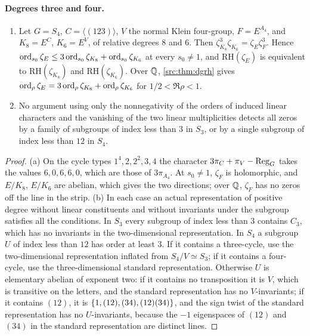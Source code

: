 \paragraph{Degrees three and four.}
\begin{proposition}\label{nab:prop:s4low}
\begin{enumerate}[label=\textup{(\alph*)}]
\item Let $G=S_4$, $C=\langle(123)\rangle$, $V$ the normal Klein four-group, $F=E^{A_4}$, and
$K_8=E^C$, $K_6=E^V$, of relative degrees $8$ and $6$. Then
$\zeta_{K_8}^3\zeta_{K_6}=\zeta_E\zeta_F^3$. Hence
$\operatorname{ord}_{s_0}\zeta_E\le3\operatorname{ord}_{s_0}\zeta_{K_8}+\operatorname{ord}_{s_0}\zeta_{K_6}$ at every $s_0\ne1$, and $\mathrm{RH}(\zeta_E)$ is equivalent to
$\mathrm{RH}(\zeta_{K_8})$ and $\mathrm{RH}(\zeta_{K_6})$. Over $\mathbb{Q}$, \cref{src:thm:dgrh} gives
$\operatorname{ord}_\rho\zeta_E=3\operatorname{ord}_\rho\zeta_{K_8}+\operatorname{ord}_\rho\zeta_{K_6}$ for $1/2<\Re\rho<1$.
\item No argument using only the nonnegativity of the orders of induced linear characters
and the vanishing of the two linear multiplicities detects all zeros by a family of
subgroups of index less than $3$ in $S_3$, or by a single subgroup of index less than $12$ in
$S_4$.
\end{enumerate}
\end{proposition}
\begin{proof}
(a) On the cycle types $1^4,2,2^2,3,4$ the character $3\pi_C+\pi_V-\operatorname{Reg}_G$ takes the values
$6,0,6,6,0$, which are those of $3\pi_{A_4}$. At $s_0\ne1$, $\zeta_F$ is holomorphic, and $E/K_8$,
$E/K_6$ are abelian, which gives the two directions; over $\mathbb{Q}$, $\zeta_F$ has no zeros off the
line in the strip. (b) In each case an actual representation of positive degree without
linear constituents and without invariants under the subgroup satisfies all the conditions.
In $S_3$ every subgroup of index less than $3$ contains $C_3$, which has no invariants in the
two-dimensional representation. In $S_4$ a subgroup $U$ of index less than $12$ has order at
least $3$. If it contains a three-cycle, use the two-dimensional representation inflated from
$S_4/V\simeq S_3$; if it contains a four-cycle, use the three-dimensional standard
representation. Otherwise $U$ is elementary abelian of exponent two: if it contains no
transposition it is $V$, which is transitive on the letters, and the standard
representation has no $V$-invariants; if it contains $(12)$, it is
$\{1,(12),(34),(12)(34)\}$, and the sign twist of the standard representation has no
$U$-invariants, because the $-1$ eigenspaces of $(12)$ and $(34)$ in the standard
representation are distinct lines.
\end{proof}

